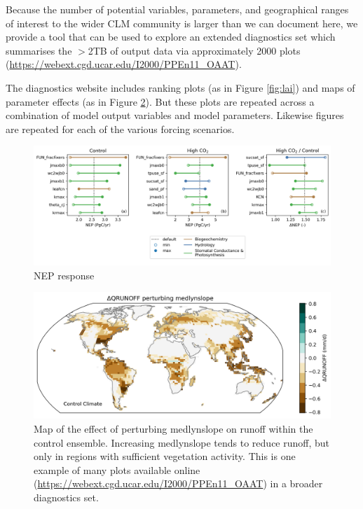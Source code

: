 \documentclass[draft]{agujournal2019}
\begin{document}
Because the number of potential variables, parameters, and geographical ranges of interest to the wider CLM community is larger than we can document here,  we provide a tool that can be used to explore an extended diagnostics set which summarises the $>$2TB of output data via approximately 2000 plots (\url{https://webext.cgd.ucar.edu/I2000/PPEn11_OAAT}). 

The diagnostics website includes ranking plots (as in Figure \ref{fig:lai}) and maps of parameter effects (as in Figure \ref{fig:panel}). But these plots are repeated across a combination of model output variables and model parameters. Likewise figures are repeated for each of the various forcing scenarios. 

\begin{figure}[h]
\centering
\includegraphics[width=\textwidth]{../figs/main/NEP_response.png}
\caption{NEP response}
\label{fig:nep}
\end{figure}


\begin{figure}[h]
\centering
\includegraphics[width=\textwidth]{../figs/QRUNOFFabs_x_medlynslope_CTL2010.png}
\caption{Map of the effect of perturbing medlynslope on runoff within the control ensemble. Increasing medlynslope tends to reduce runoff, but only in regions with sufficient vegetation activity. This is one example of many plots available online (\url{https://webext.cgd.ucar.edu/I2000/PPEn11_OAAT}) in a broader diagnostics set. }
\label{fig:panel}
\end{figure}
\end{document}
